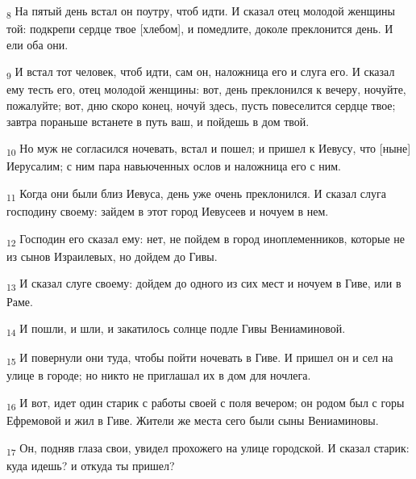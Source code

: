 \begin{tcolorbox}
\textsubscript{8} На пятый день встал он поутру, чтоб идти. И сказал отец молодой женщины той: подкрепи сердце твое [хлебом], и помедлите, доколе преклонится день. И ели оба они.
\end{tcolorbox}
\begin{tcolorbox}
\textsubscript{9} И встал тот человек, чтоб идти, сам он, наложница его и слуга его. И сказал ему тесть его, отец молодой женщины: вот, день преклонился к вечеру, ночуйте, пожалуйте; вот, дню скоро конец, ночуй здесь, пусть повеселится сердце твое; завтра пораньше встанете в путь ваш, и пойдешь в дом твой.
\end{tcolorbox}
\begin{tcolorbox}
\textsubscript{10} Но муж не согласился ночевать, встал и пошел; и пришел к Иевусу, что [ныне] Иерусалим; с ним пара навьюченных ослов и наложница его с ним.
\end{tcolorbox}
\begin{tcolorbox}
\textsubscript{11} Когда они были близ Иевуса, день уже очень преклонился. И сказал слуга господину своему: зайдем в этот город Иевусеев и ночуем в нем.
\end{tcolorbox}
\begin{tcolorbox}
\textsubscript{12} Господин его сказал ему: нет, не пойдем в город иноплеменников, которые не из сынов Израилевых, но дойдем до Гивы.
\end{tcolorbox}
\begin{tcolorbox}
\textsubscript{13} И сказал слуге своему: дойдем до одного из сих мест и ночуем в Гиве, или в Раме.
\end{tcolorbox}
\begin{tcolorbox}
\textsubscript{14} И пошли, и шли, и закатилось солнце подле Гивы Вениаминовой.
\end{tcolorbox}
\begin{tcolorbox}
\textsubscript{15} И повернули они туда, чтобы пойти ночевать в Гиве. И пришел он и сел на улице в городе; но никто не приглашал их в дом для ночлега.
\end{tcolorbox}
\begin{tcolorbox}
\textsubscript{16} И вот, идет один старик с работы своей с поля вечером; он родом был с горы Ефремовой и жил в Гиве. Жители же места сего были сыны Вениаминовы.
\end{tcolorbox}
\begin{tcolorbox}
\textsubscript{17} Он, подняв глаза свои, увидел прохожего на улице городской. И сказал старик: куда идешь? и откуда ты пришел?
\end{tcolorbox}
